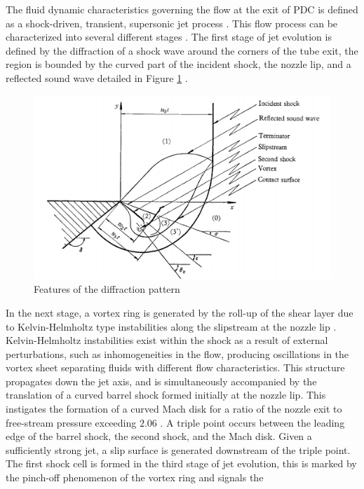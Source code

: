 The fluid dynamic characteristics governing the flow at the exit of PDC is defined as a shock-driven, transient, supersonic jet process \cite{radulescu2007}. This flow process can be characterized into several different stages \cite{ishii1999}. The first stage of jet evolution is defined by the diffraction of a shock wave around the corners of the tube exit, the region is bounded by the curved part of the incident shock, the nozzle lip, and a reflected sound wave detailed in Figure \ref{fig:0} \cite{skews1967}. 
\begin{figure}[h]  
\centering
\includegraphics[scale=0.7]{fig0.PNG}
\caption{Features of the diffraction pattern \cite{skews1967}}
\label{fig:0}
\end{figure}
In the next stage, a vortex ring is generated by the roll-up of the shear layer due to Kelvin-Helmholtz type instabilities along the slipstream at the nozzle lip \cite{elder1952,dora2014}. Kelvin-Helmholtz instabilities exist within the shock as a result of external perturbations, such as inhomogeneities in the flow, producing oscillations in the vortex sheet separating fluids with different flow characteristics. This structure propagates down the jet axis, and is simultaneously accompanied by the translation of a curved barrel shock formed initially at the nozzle lip. This instigates the formation of a curved Mach disk for a ratio of the nozzle exit to free-stream pressure exceeding $2.06$ \cite{matsuda1987}. A triple point occurs between the leading edge of the barrel shock, the second shock, and the Mach disk. Given a sufficiently strong jet, a slip surface is generated downstream of the triple point. The first shock cell is formed in the third stage of jet evolution, this is marked by the pinch-off phenomenon of the vortex ring and signals the
